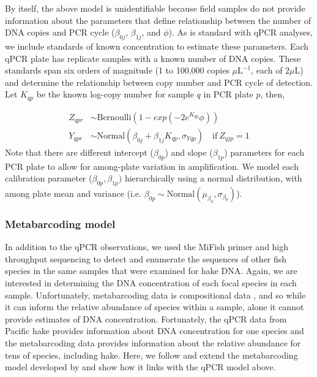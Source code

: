 \documentclass{article}
\begin{document}
By itself, the above model is unidentifiable because field samples do not provide information about the parameters that define relationship between the number of DNA copies and PCR cycle ($\beta_{0j}$, $\beta_{1j}$, and $\phi$). As is standard with qPCR analyses, we include standards of known concentration to estimate these parameters. Each qPCR plate has replicate samples with a known number of DNA copies. These standards span six orders of magnitude (1 to 100,000 copies $\mu \mathrm{L}^{-1}$, each of 2$\mu \mathrm{L}$) and determine the relationship between copy number and PCR cycle of detection. Let $K_{qp}$ be the known log-copy number for sample $q$ in PCR plate $p$, then,

\begin{align}
  Z_{qpr} &\sim  \mathrm{Bernoulli} \left(1-exp(-2 e^{K_{qp}} \phi) \right)\\
  Y_{qpr} &\sim  \mathrm{Normal} \left(\beta_{0j}+\beta_{1j}{K_{qp}},\sigma_{Yqp}\right) \quad  \mathrm{if} \: Z_{qjp} =1
\end{align}
Note that there are different intercept ($\beta_{0p}$) and slope ($\beta_{1p}$) parameters for each PCR plate to allow for among-plate variation in amplification. We model each calibration parameter ($\beta_{0p},\beta_{1p})$ hierarchically using a normal distribution, with among plate mean and variance (i.e. $\beta_{0p} \sim \mathrm{Normal}(\mu_{\beta_{0}},\sigma_{\beta_{0}})$).

\subsubsection*{Metabarcoding model}

In addition to the qPCR observations, we used the MiFish primer and high throughput sequencing to detect and enumerate the sequences of other fish species in the same samples that were examined for hake DNA. Again, we are interested in determining the DNA concentration of each focal species in each sample. Unfortunately, metabarcoding data is compositional data \cite{shelton2023}, and so while it can inform the relative abundance of species within a sample, alone it cannot provide estimates of DNA concentration. Fortunately, the qPCR data from Pacific hake provides information about DNA concentration for one species and the metabarcoding data provides information about the relative abundance for tens of species, including hake. Here, we follow and extend the metabarcoding model developed by \cite{shelton2023} and show how it links with the qPCR model above. 
\end{document}
